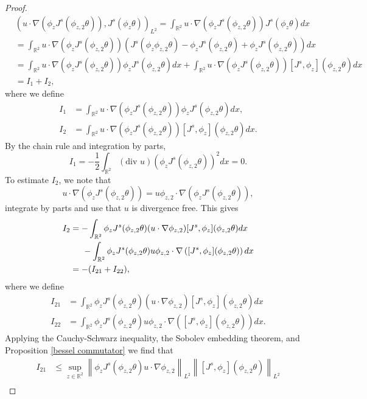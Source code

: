 \documentclass[12pt,xcolor=svgnames]{amsart}
\newcommand{\R}{\mathbb{R}}
\newcommand{\norm}[2]{\left\lVert#1\right\rVert_{#2}}
\begin{document}
\begin{proof}
\begin{align*}
&(u\cdot\nabla(\phi_zJ^s(\phi_{z,2}\theta)),J^s(\phi_z\theta))_{L^2} = \int_{\R^2} u\cdot\nabla(\phi_zJ^s(\phi_{z,2}\theta)) J^s(\phi_z\theta) dx\\
&=\int_{\R^2} u\cdot\nabla(\phi_zJ^s(\phi_{z,2}\theta))(J^s(\phi_z\phi_{z,2}\theta)-\phi_zJ^s(\phi_{z,2}\theta)+\phi_zJ^s(\phi_{z,2}\theta))dx\\
&=
\int_{\R^2}u\cdot\nabla(\phi_zJ^s(\phi_{z,2}\theta))\phi_zJ^s(\phi_{z,2}\theta) dx + \int_{\R^2}u\cdot\nabla(\phi_zJ^s(\phi_{z,2}\theta))[J^s,\phi_z](\phi_{z,2}\theta) dx\\
&= I_1 + I_2,
\end{align*}
where we define
\begin{align*}
I_1 & = \int_{\R^2}u\cdot\nabla(\phi_zJ^s(\phi_{z,2}\theta))\phi_zJ^s(\phi_{z,2}\theta) dx,\\
I_2 &= \int_{\R^2}u\cdot\nabla(\phi_zJ^s(\phi_{z,2}\theta))[J^s,\phi_z](\phi_{z,2}\theta) dx.
\end{align*}
By the chain rule and integration by parts, 
$$
I_1 = -\frac{1}{2} \int_{\R^2} (\text{div }u)(\phi_zJ^s(\phi_{z,2}\theta))^2 dx = 0.
$$
To estimate $I_2$, we note that 
$$
u\cdot\nabla(\phi_zJ^s(\phi_{z,2}\theta)) = u\phi_{z,2}\cdot\nabla(\phi_zJ^s(\phi_{z,2}\theta)),
$$
integrate by parts and use that $u$ is divergence free. This gives 
\begin{align*}
I_2 &= -\int_{\R^2} \phi_z J^s(\phi_{z,2}\theta)(u\cdot\nabla \phi_{z,2})[J^s,\phi_z](\phi_{z,2}\theta) dx\\ & \hspace{.5cm}- \int_{\R^2} \phi_z J^s(\phi_{z,2}\theta)u\phi_{z,2}\cdot \nabla \left([J^s,\phi_z](\phi_{z,2}\theta)\right)dx \\
&= -(I_{21}+I_{22}),
\end{align*}
where we define 
\begin{align*}
I_{21} &= \int_{\R^2} \phi_z J^s(\phi_{z,2}\theta)(u\cdot\nabla \phi_{z,2})[J^s,\phi_z](\phi_{z,2}\theta) dx \\
I_{22} &= \int_{\R^2} \phi_z J^s(\phi_{z,2}\theta)u\phi_{z,2}\cdot \nabla \left([J^s,\phi_z](\phi_{z,2}\theta)\right)dx.
\end{align*}
Applying the Cauchy-Schwarz inequality, the Sobolev embedding theorem,  and Proposition \ref{bessel commutator} we find that 
\begin{align*}
I_{21} &\leq  \sup_{z \in \R^2} \norm{\phi_zJ^s(\phi_{z,2}\theta)u\cdot \nabla \phi_{z,2}}{L^2}\norm{[J^s,\phi_z](\phi_{z,2}\theta)}{L^2}\\

\end{align*}
\end{proof}
\end{document}
